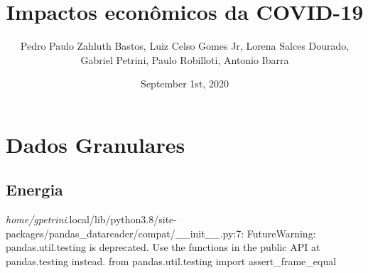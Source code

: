 \documentclass[11pt]{article}
\author{Pedro Paulo Zahluth Bastos, Luiz Celso Gomes Jr, Lorena Salces Dourado, Gabriel Petrini, Paulo Robilloti, Antonio Ibarra}
\date{September 1st, 2020}
\title{Impactos econômicos da COVID-19}
\begin{document}
\maketitle
\tableofcontents


\section{Dados Granulares}
\label{sec:org0025097}

\subsection{Energia}
\label{sec:org8345e25}

\emph{home/gpetrini}.local/lib/python3.8/site-packages/pandas\_datareader/compat/\_\_init\_\_.py:7: FutureWarning: pandas.util.testing is deprecated. Use the functions in the public API at pandas.testing instead.
  from pandas.util.testing import assert\_frame\_equal
\end{document}
